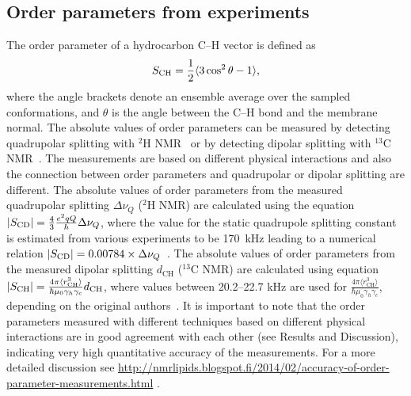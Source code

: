 \documentclass[pre,aps,floatfix,authordate1-4,twocolumn]{revtex4-1}
\begin{document}
\subsection{Order parameters from experiments}\label{expORDp}
The order parameter of a hydrocarbon C--H vector is defined as 
\begin{equation}\label{orderP}
S_{{\rm CH}}=\frac{1}{2}\langle 3 \cos^2 \theta-1 \rangle,
\end{equation} 
where the angle brackets denote an ensemble average over the sampled conformations, and $\theta$ is the angle between the C--H bond and the membrane normal.
The absolute values of order parameters can be measured by detecting quadrupolar splitting with $^2$H NMR~\cite{seelig77c} or by detecting dipolar 
splitting with $^{13}$C NMR~\cite{hong95a,gross97,dvinskikh05a,ferreira13}. The measurements are based on
different physical interactions and also the connection between order parameters and quadrupolar or dipolar splitting
are different. The absolute values of order parameters from the measured quadrupolar splitting $\Delta \nu_Q$ ($^2$H NMR) are calculated using 
the equation $|S_{{\rm CD}}|=\frac{4}{3} \frac{e^2qQ}{h} \Delta \nu_Q$, where the value for the static quadrupole
splitting constant is estimated from various experiments to be 170~kHz leading to a numerical relation $|S_{{\rm CD}}|=0.00784 \times \Delta \nu_Q$~\cite{seelig77c}. 
The absolute values of order parameters from the measured dipolar splitting $d_\mathrm{CH}$ ($^{13}$C NMR) are calculated using equation
$|S_{{\rm CH}}|=\frac{4\pi\langle r_\mathrm{CH}^3 \rangle}{\hbar \mu_0 \gamma_h \gamma_c} d_\mathrm{CH}$, where
values between 20.2--22.7 kHz are used for $\frac{4\pi\langle r_\mathrm{CH}^3 \rangle}{\hbar \mu_0 \gamma_h \gamma_c}$,
depending on the original authors~\cite{hong95a,gross97,dvinskikh05a,ferreira13}.
It is important to note that the order parameters measured with different techniques based on different physical interactions are in good agreement
with each other (see Results and Discussion), indicating very high quantitative accuracy of the measurements.
For a more detailed discussion see \url{http://nmrlipids.blogspot.fi/2014/02/accuracy-of-order-parameter-measurements.html}
.
\end{document}
